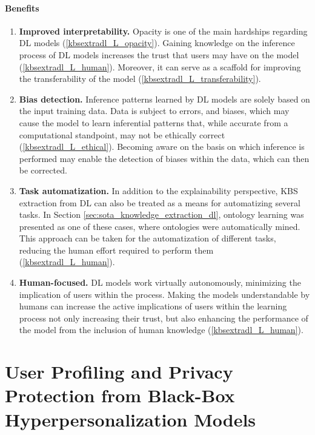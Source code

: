 \paragraph{Benefits}
\begin{enumerate} [start=1,label={\bfseries B\arabic*.}]
    \item \textbf{Improved interpretability.}\label{kbsextradl_B_interpretability} Opacity is one of the main hardships regarding DL models (\ref{kbsextradl_L_opacity}). Gaining knowledge on the inference process of DL models increases the trust that users may have on the model (\ref{kbsextradl_L_human}). Moreover, it can serve as a scaffold for improving the transferability of the model (\ref{kbsextradl_L_transferability}).
    
    \item \textbf{Bias detection.}\label{kbsextradl_B_bias} Inference patterns learned by DL models are solely based on the input training data. Data is subject to errors, and biases, which may cause the model to learn inferential patterns that, while accurate from a computational standpoint, may not be ethically correct (\ref{kbsextradl_L_ethical}). Becoming aware on the basis on which inference is performed may enable the detection of biases within the data, which can then be corrected.
    
    \item \textbf{Task automatization.}\label{kbsextradl_B_automatization} In addition to the explainability perspective, KBS extraction from DL can also be treated as a means for automatizing several tasks. In Section \ref{sec:sota_knowledge_extraction_dl}, ontology learning was presented as one of these cases, where ontologies were automatically mined. This approach can be taken for the automatization of different tasks, reducing the human effort required to perform them (\ref{kbsextradl_L_human}).
    
    \item \textbf{Human-focused.}\label{kbsextradl_B_human} DL models work virtually autonomously, minimizing the implication of users within the process. Making the models understandable by humans can increase the active implications of users within the learning process not only increasing their trust, but also enhancing the performance of the model from the inclusion of human knowledge (\ref{kbsextradl_L_human}). 
\end{enumerate}
\section{User Profiling and Privacy Protection from Black-Box Hyperpersonalization Models}\label{6_sec:mas_bbhos_general}

